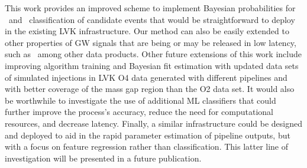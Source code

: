 This work provides an improved scheme to implement Bayesian probabilities for \hasns\ and \hasrem\ classification of candidate events that would be straightforward to deploy in the
existing LVK infrastructure. Our method can also be easily extended to other properties of \ac{GW} signals that are being or may be released in low latency, such as \hasgap\ among other
data products. Other future extensions of this work include improving algorithm training and Bayesian fit estimation with updated data sets of simulated injections in \ac{LVK} \ac{O4}
data generated with different pipelines and with better coverage of the mass gap region than the \ac{O2} data set. It would also be worthwhile to investigate the use of additional ML
classifiers that could further improve the process's accuracy, reduce the need for computational resources, and decrease latency. Finally, a similar infrastructure could be designed and
deployed to aid in the rapid parameter estimation of pipeline outputs, but with a focus on feature regression rather than classification. This latter line of investigation will be
presented in a future publication.


